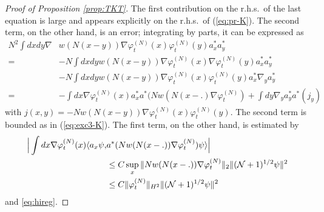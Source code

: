 \documentclass[11pt,a4paper]{article}
\newcommand{\cN}{{\cal N}}
\newcommand{\ph}{\varphi_t^{(N)}}	%
\begin{document}
\begin{proof}[Proof of Proposition \ref{prop:TKT}]
The first contribution on the r.h.s.\ of the last equation is large and appears explicitly on the r.h.s.\ of (\ref{eq:pr-K}). The second term, on the other hand, is an error; integrating by parts, it can be expressed as
\[ \begin{split} N^2 \int dx dy \nabla &w (N (x-y)) \nabla \varphi^{(N)}_t (x) \varphi_t^{(N)} (y) a_x^* a_y^* \\ = \; &- N \int dx dy  w (N (x-y)) \nabla \varphi^{(N)}_t (x) \nabla \varphi_t^{(N)} (y) a_x^* a_y^* \\ &- N \int dx dy w (N (x-y)) \nabla \varphi^{(N)}_t (x)  \varphi_t^{(N)} (y) a_x^* \nabla_y a_y^*  \\ = \; &- \int dx \nabla \varphi_t^{(N)} (x) a_x^* a^* (N w(N(x-.) \nabla \varphi_t^{(N)}) + \int dy  \nabla_y a_y^* a^* (j_y) \end{split} \]
with $j(x,y) = -N w(N(x-y)) \nabla\ph(x)\ph(y)$. The second term is bounded as in (\ref{eq:exc3-K}). The first term, on the other hand, is estimated by
\begin{equation}\label{eq:lmK-sp} \begin{split}\Big|   \int dx \nabla \varphi_t^{(N)} (x)  \langle a_x \psi, &a^* (N w(N(x-.)) \nabla \varphi_t^{(N)}) \psi \rangle \Big| \\ &\leq C \sup_x \| N w(N(x-.)) \nabla \varphi_t^{(N)} \|_2 \| (\cN+1)^{1/2} \psi \|^2 \\ &\leq C \| \varphi_t^{(N)} \|_{H^2} \| (\cN+1)^{1/2} \psi \|^2   \end{split} \end{equation} and \eqref{eq:hireg}.


\end{proof}
\end{document}
